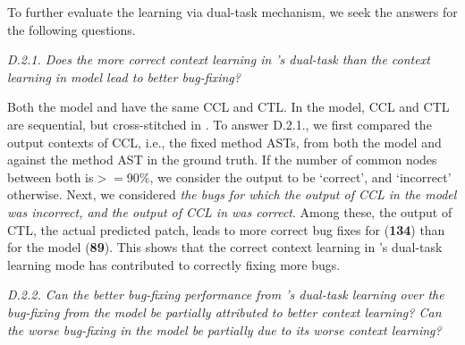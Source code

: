 To further evaluate the learning via dual-task
mechanism, we  seek the answers for the following questions.



{\em D.2.1. Does the more correct context learning in {\tool}'s
  dual-task than the context learning in 
   model lead to better bug-fixing?}

Both the  model and {\tool} have the same CCL and
CTL. In the  model, CCL and CTL are sequential, but
cross-stitched in {\tool}. To answer D.2.1., we first compared the
output contexts of CCL, i.e., the fixed method ASTs, from both the
 model and {\tool} against the method AST in the
ground truth. If the number of common nodes between both is$>=$90\%,
we consider the output to be `correct', and `incorrect'
otherwise. Next, we considered {\em the bugs for which the output of
  CCL in the  model was incorrect, and the output of
  CCL in {\tool} was correct}. Among these, the output of CTL, the
actual predicted patch, leads to more correct bug fixes for {\tool}
({\bf 134}) than for the  model ({\bf 89}). This shows
that the correct context learning in {\tool}'s dual-task learning
mode has contributed to correctly fixing more bugs.


{\em D.2.2. Can the better bug-fixing performance from {\tool}'s
  dual-task learning over the bug-fixing from the 
  model be partially attributed to better context learning? Can the
  worse bug-fixing in the  model be partially due to
  its worse context learning?}


